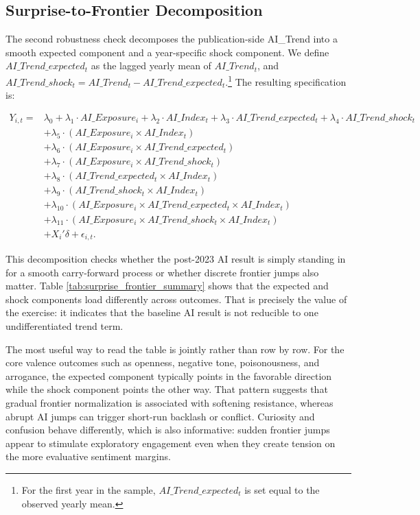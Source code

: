 \documentclass[11pt]{article}
\begin{document}
\FloatBarrier

\subsection{Surprise-to-Frontier Decomposition}

The second robustness check decomposes the publication-side AI\_Trend into a smooth expected component and a year-specific shock component. We define $AI\_Trend\_expected_t$ as the lagged yearly mean of $AI\_Trend_t$, and $AI\_Trend\_shock_t = AI\_Trend_t - AI\_Trend\_expected_t$.\footnote{For the first year in the sample, $AI\_Trend\_expected_t$ is set equal to the observed yearly mean.} The resulting specification is:

\begin{equation}
\begin{aligned}
Y_{i,t} ={}& \lambda_0 + \lambda_1 \cdot AI\_Exposure_i + \lambda_2 \cdot AI\_Index_t
+ \lambda_3 \cdot AI\_Trend\_expected_t + \lambda_4 \cdot AI\_Trend\_shock_t \\
&+ \lambda_5 \cdot \left(AI\_Exposure_i \times AI\_Index_t\right) \\
&+ \lambda_6 \cdot \left(AI\_Exposure_i \times AI\_Trend\_expected_t\right) \\
&+ \lambda_7 \cdot \left(AI\_Exposure_i \times AI\_Trend\_shock_t\right) \\
&+ \lambda_8 \cdot \left(AI\_Trend\_expected_t \times AI\_Index_t\right) \\
&+ \lambda_9 \cdot \left(AI\_Trend\_shock_t \times AI\_Index_t\right) \\
&+ \lambda_{10} \cdot \left(AI\_Exposure_i \times AI\_Trend\_expected_t \times AI\_Index_t\right) \\
&+ \lambda_{11} \cdot \left(AI\_Exposure_i \times AI\_Trend\_shock_t \times AI\_Index_t\right) \\
&+ X_i' \delta + \epsilon_{i,t}.
\end{aligned}
\end{equation}

This decomposition checks whether the post-2023 AI result is simply standing in for a smooth carry-forward process or whether discrete frontier jumps also matter. Table \ref{tab:surprise_frontier_summary} shows that the expected and shock components load differently across outcomes. That is precisely the value of the exercise: it indicates that the baseline AI result is not reducible to one undifferentiated trend term.

The most useful way to read the table is jointly rather than row by row. For the core valence outcomes such as openness, negative tone, poisonousness, and arrogance, the expected component typically points in the favorable direction while the shock component points the other way. That pattern suggests that gradual frontier normalization is associated with softening resistance, whereas abrupt AI jumps can trigger short-run backlash or conflict. Curiosity and confusion behave differently, which is also informative: sudden frontier jumps appear to stimulate exploratory engagement even when they create tension on the more evaluative sentiment margins.
\end{document}
